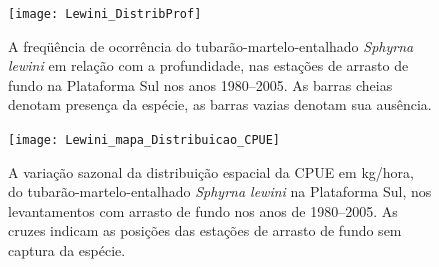 \documentclass[a4paper,11pt,twoside,showtrims,onecolumn,openright,final]{memoir}
\begin{document}
%
%

\begin{figure}
\begin{center}
\texttt{[image: Lewini\_DistribProf]}
\end{center}
\caption[A freqüência de ocorrência do tubarão-martelo-entalhado  \emph{Sphyrna lewini}
	em relação com a profundidade, nas estações de arrasto de 
	fundo na Plataforma Sul nos anos 1980--2005]
	{A freqüência de ocorrência do tubarão-martelo-entalhado  \emph{Sphyrna lewini}
	em relação com a profundidade, nas estações de arrasto de 
	fundo na Plataforma Sul nos anos 1980--2005. 
	As barras cheias denotam presença da espécie, 
	as barras vazias denotam sua ausência.}
\label{fig:fo-lewini-profundidade}
\end{figure}


%
%

\begin{figure}
\begin{center}
\texttt{[image: Lewini\_mapa\_Distribuicao\_CPUE]}
\end{center}
\caption[Variação sazonal da distribuição espacial da CPUE em kg/hora, do tubarão-martelo-entalhado  \emph{Sphyrna lewini}]
	{A variação sazonal da distribuição espacial da CPUE em kg/hora, do tubarão-martelo-entalhado  \emph{Sphyrna lewini} 
	 na Plataforma Sul, nos levantamentos com arrasto de fundo nos anos de 1980--2005. 
	 As cruzes indicam as posições das estações de arrasto de fundo sem captura da espécie.}
\label{fig:lewini-mapacpue}
\end{figure}


%
%
\end{document}
